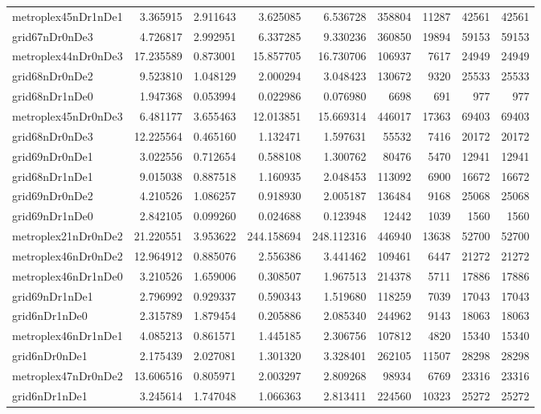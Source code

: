 \begin{longtable}{|l|r|r|r|r|r|r|r|r|}
metroplex45nDr1nDe1 & 3.365915 & 2.911643 & 3.625085 & 6.536728 & 358804 & 11287 & 42561 & 42561 \\
grid67nDr0nDe3 & 4.726817 & 2.992951 & 6.337285 & 9.330236 & 360850 & 19894 & 59153 & 59153 \\
metroplex44nDr0nDe3 & 17.235589 & 0.873001 & 15.857705 & 16.730706 & 106937 & 7617 & 24949 & 24949 \\
grid68nDr0nDe2 & 9.523810 & 1.048129 & 2.000294 & 3.048423 & 130672 & 9320 & 25533 & 25533 \\
grid68nDr1nDe0 & 1.947368 & 0.053994 & 0.022986 & 0.076980 & 6698 & 691 & 977 & 977 \\
metroplex45nDr0nDe3 & 6.481177 & 3.655463 & 12.013851 & 15.669314 & 446017 & 17363 & 69403 & 69403 \\
grid68nDr0nDe3 & 12.225564 & 0.465160 & 1.132471 & 1.597631 & 55532 & 7416 & 20172 & 20172 \\
grid69nDr0nDe1 & 3.022556 & 0.712654 & 0.588108 & 1.300762 & 80476 & 5470 & 12941 & 12941 \\
grid68nDr1nDe1 & 9.015038 & 0.887518 & 1.160935 & 2.048453 & 113092 & 6900 & 16672 & 16672 \\
grid69nDr0nDe2 & 4.210526 & 1.086257 & 0.918930 & 2.005187 & 136484 & 9168 & 25068 & 25068 \\
grid69nDr1nDe0 & 2.842105 & 0.099260 & 0.024688 & 0.123948 & 12442 & 1039 & 1560 & 1560 \\
metroplex21nDr0nDe2 & 21.220551 & 3.953622 & 244.158694 & 248.112316 & 446940 & 13638 & 52700 & 52700 \\
metroplex46nDr0nDe2 & 12.964912 & 0.885076 & 2.556386 & 3.441462 & 109461 & 6447 & 21272 & 21272 \\
metroplex46nDr1nDe0 & 3.210526 & 1.659006 & 0.308507 & 1.967513 & 214378 & 5711 & 17886 & 17886 \\
grid69nDr1nDe1 & 2.796992 & 0.929337 & 0.590343 & 1.519680 & 118259 & 7039 & 17043 & 17043 \\
grid6nDr1nDe0 & 2.315789 & 1.879454 & 0.205886 & 2.085340 & 244962 & 9143 & 18063 & 18063 \\
metroplex46nDr1nDe1 & 4.085213 & 0.861571 & 1.445185 & 2.306756 & 107812 & 4820 & 15340 & 15340 \\
grid6nDr0nDe1 & 2.175439 & 2.027081 & 1.301320 & 3.328401 & 262105 & 11507 & 28298 & 28298 \\
metroplex47nDr0nDe2 & 13.606516 & 0.805971 & 2.003297 & 2.809268 & 98934 & 6769 & 23316 & 23316 \\
grid6nDr1nDe1 & 3.245614 & 1.747048 & 1.066363 & 2.813411 & 224560 & 10323 & 25272 & 25272 \\

\end{longtable}
